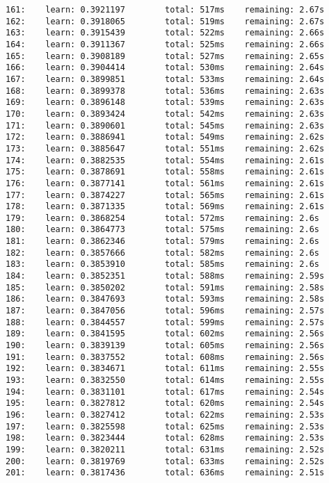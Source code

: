 \documentclass[11pt]{article}
\begin{document}
\begin{Verbatim}[commandchars=\\\{\}]
161:    learn: 0.3921197        total: 517ms    remaining: 2.67s
162:    learn: 0.3918065        total: 519ms    remaining: 2.67s
163:    learn: 0.3915439        total: 522ms    remaining: 2.66s
164:    learn: 0.3911367        total: 525ms    remaining: 2.66s
165:    learn: 0.3908189        total: 527ms    remaining: 2.65s
166:    learn: 0.3904414        total: 530ms    remaining: 2.64s
167:    learn: 0.3899851        total: 533ms    remaining: 2.64s
168:    learn: 0.3899378        total: 536ms    remaining: 2.63s
169:    learn: 0.3896148        total: 539ms    remaining: 2.63s
170:    learn: 0.3893424        total: 542ms    remaining: 2.63s
171:    learn: 0.3890601        total: 545ms    remaining: 2.63s
172:    learn: 0.3886941        total: 549ms    remaining: 2.62s
173:    learn: 0.3885647        total: 551ms    remaining: 2.62s
174:    learn: 0.3882535        total: 554ms    remaining: 2.61s
175:    learn: 0.3878691        total: 558ms    remaining: 2.61s
176:    learn: 0.3877141        total: 561ms    remaining: 2.61s
177:    learn: 0.3874227        total: 565ms    remaining: 2.61s
178:    learn: 0.3871335        total: 569ms    remaining: 2.61s
179:    learn: 0.3868254        total: 572ms    remaining: 2.6s
180:    learn: 0.3864773        total: 575ms    remaining: 2.6s
181:    learn: 0.3862346        total: 579ms    remaining: 2.6s
182:    learn: 0.3857666        total: 582ms    remaining: 2.6s
183:    learn: 0.3853910        total: 585ms    remaining: 2.6s
184:    learn: 0.3852351        total: 588ms    remaining: 2.59s
185:    learn: 0.3850202        total: 591ms    remaining: 2.58s
186:    learn: 0.3847693        total: 593ms    remaining: 2.58s
187:    learn: 0.3847056        total: 596ms    remaining: 2.57s
188:    learn: 0.3844557        total: 599ms    remaining: 2.57s
189:    learn: 0.3841595        total: 602ms    remaining: 2.56s
190:    learn: 0.3839139        total: 605ms    remaining: 2.56s
191:    learn: 0.3837552        total: 608ms    remaining: 2.56s
192:    learn: 0.3834671        total: 611ms    remaining: 2.55s
193:    learn: 0.3832550        total: 614ms    remaining: 2.55s
194:    learn: 0.3831101        total: 617ms    remaining: 2.54s
195:    learn: 0.3827812        total: 620ms    remaining: 2.54s
196:    learn: 0.3827412        total: 622ms    remaining: 2.53s
197:    learn: 0.3825598        total: 625ms    remaining: 2.53s
198:    learn: 0.3823444        total: 628ms    remaining: 2.53s
199:    learn: 0.3820211        total: 631ms    remaining: 2.52s
200:    learn: 0.3819769        total: 633ms    remaining: 2.52s
201:    learn: 0.3817436        total: 636ms    remaining: 2.51s

\end{Verbatim}
\end{document}
